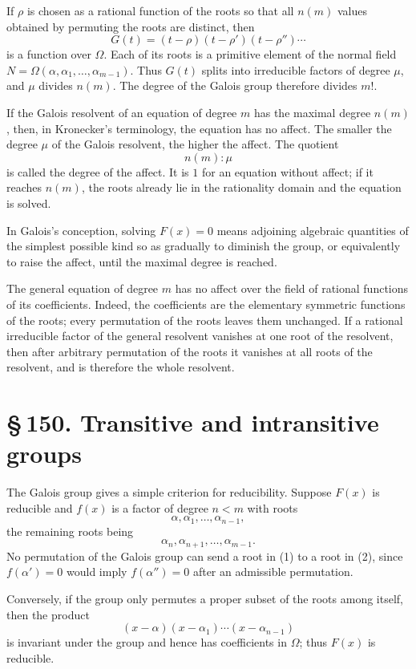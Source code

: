 \documentclass[11pt]{article}
\providecommand{\sect}[2]{\section*{\S\,#1. #2}}
\begin{document}
If $\rho$ is chosen as a rational function of the roots so that all $n(m)$ values obtained by permuting the roots are distinct, then
\[
        G(t)=(t-\rho)(t-\rho')(t-\rho'')\cdots
\]
is a function over $\Omega$. Each of its roots is a primitive element of the normal field $N=\Omega(\alpha,
\alpha_1,
\ldots,
\alpha_{m-1})$. Thus $G(t)$ splits into irreducible factors of degree $\mu$, and $\mu$ divides $n(m)$. The degree of the Galois group therefore divides $m!$.

If the Galois resolvent of an equation of degree $m$ has the maximal degree $n(m)$, then, in Kronecker's terminology, the equation has no affect. The smaller the degree $\mu$ of the Galois resolvent, the higher the affect. The quotient
\[
        n(m):\mu
\]
is called the degree of the affect. It is $1$ for an equation without affect; if it reaches $n(m)$, the roots already lie in the rationality domain and the equation is solved.

In Galois's conception, solving $F(x)=0$ means adjoining algebraic quantities of the simplest possible kind so as gradually to diminish the group, or equivalently to raise the affect, until the maximal degree is reached.

The general equation of degree $m$ has no affect over the field of rational functions of its coefficients. Indeed, the coefficients are the elementary symmetric functions of the roots; every permutation of the roots leaves them unchanged. If a rational irreducible factor of the general resolvent vanishes at one root of the resolvent, then after arbitrary permutation of the roots it vanishes at all roots of the resolvent, and is therefore the whole resolvent.

\sect{150}{Transitive and intransitive groups}

The Galois group gives a simple criterion for reducibility. Suppose $F(x)$ is reducible and $f(x)$ is a factor of degree $n<m$ with roots
\[
        \alpha,
\alpha_1,
\ldots,
\alpha_{n-1},
\tag{1}
\]
the remaining roots being
\[
        \alpha_n,
\alpha_{n+1},
\ldots,
\alpha_{m-1}.
\tag{2}
\]
No permutation of the Galois group can send a root in (1) to a root in (2), since $f(\alpha')=0$ would imply $f(\alpha'')=0$ after an admissible permutation.

Conversely, if the group only permutes a proper subset of the roots among itself, then the product
\[
        (x-\alpha)(x-\alpha_1)\cdots(x-\alpha_{n-1})
\]
is invariant under the group and hence has coefficients in $\Omega$; thus $F(x)$ is reducible.
\end{document}
